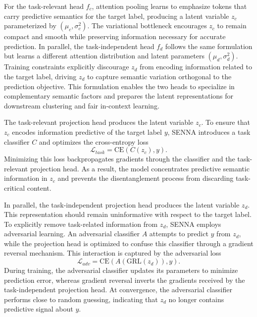 \documentclass[runningheads]{llncs}
\begin{document}
For the task-relevant head $f_c$, attention pooling learns to emphasize tokens that carry predictive
semantics for the target label, producing a latent variable $z_c$ parameterized by
$(\mu_c, \sigma_c^2)$.
The variational bottleneck encourages $z_c$ to remain compact and smooth while preserving
information necessary for accurate prediction.
In parallel, the task-independent head $f_d$ follows the same formulation but learns a different
attention distribution and latent parameters $(\mu_d, \sigma_d^2)$.
Training constraints explicitly discourage $z_d$ from encoding information related to the target
label, driving $z_d$ to capture semantic variation orthogonal to the prediction objective.
This formulation enables the two heads to specialize in complementary semantic factors and prepares
the latent representations for downstream clustering and fair in-context learning.


The task-relevant projection head produces the latent variable $z_c$.
To ensure that $z_c$ encodes information predictive of the target label $y$, SENNA introduces a
task classifier $C$ and optimizes the cross-entropy loss
\begin{equation}
\mathcal{L}_{task} = \mathrm{CE}(C(z_c), y).
\end{equation}
Minimizing this loss backpropagates gradients through the classifier and the task-relevant
projection head.
As a result, the model concentrates predictive semantic information in $z_c$ and prevents the
disentanglement process from discarding task-critical content.

In parallel, the task-independent projection head produces the latent variable $z_d$.
This representation should remain uninformative with respect to the target label.
To explicitly remove task-related information from $z_d$, SENNA employs adversarial learning.
An adversarial classifier $A$ attempts to predict $y$ from $z_d$, while the projection head is
optimized to confuse this classifier through a gradient reversal mechanism.
This interaction is captured by the adversarial loss
\begin{equation}
\mathcal{L}_{adv} = \mathrm{CE}(A(\mathrm{GRL}(z_d)), y).
\end{equation}
During training, the adversarial classifier updates its parameters to minimize prediction error,
whereas gradient reversal inverts the gradients received by the task-independent projection head.
At convergence, the adversarial classifier performs close to random guessing, indicating that
$z_d$ no longer contains predictive signal about $y$.
\end{document}

